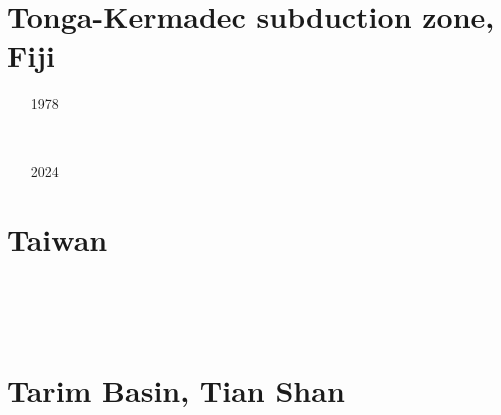 \section{Tonga-Kermadec subduction zone, Fiji }

\begin{small}
\begin{itemize}
\item[1978]
\item[\twothousandthree] 
 \\
\item[\twothousandsix] 
\item[\twothousandsixteen] 
\item[\twothousandseventeen] 
\item[\twothousandtwentyone] 
\item[\twothousandtwentythree] 
\item[2024]
\end{itemize}
\end{small}

\section{Taiwan}

\begin{small}
\begin{itemize}
\item[\twothousandone]
\item[\twothousandsix]
\item[\twothousandeight]
\item[\twothousandnine]
 \\
\item[\twothousandsixteen]
 \\ 
\item[\twothousandnineteen]
\item[\twothousandtwenty]
\item[\twothousandtwentyone]
\end{itemize}
\end{small}

\section{Tarim Basin, Tian Shan } 

